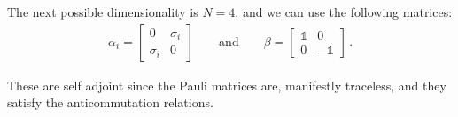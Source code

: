 \documentclass[main.tex]{subfiles}
\begin{document}
The next possible dimensionality is \(N=4\), and we can use the following matrices: 
%
\begin{subequations}
\begin{align}
\alpha_{i} = \left[\begin{array}{cc}
0 & \sigma_{i} \\ 
\sigma_{i} & 0
\end{array}\right]
\qquad \text{and} \qquad
\beta = \left[\begin{array}{cc}
\mathbb{1} & 0 \\ 
0 & -\mathbb{1}
\end{array}\right]  
\,.
\end{align}
\end{subequations}

These are self adjoint since the Pauli matrices are, manifestly traceless, and they satisfy the anticommutation relations. 
\end{document}
